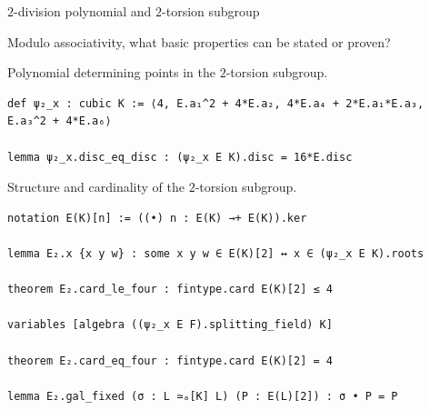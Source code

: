 \documentclass[10pt]{beamer}
\begin{document}
\begin{frame}[fragile, t]{$ 2 $-division polynomial and $ 2 $-torsion subgroup}

Modulo associativity, what basic properties can be stated or proven?

\vspace{0.5cm}

Polynomial determining points in the $ 2 $-torsion subgroup.

\begin{lstlisting}[basicstyle=\scriptsize, frame=single]
def ψ₂_x : cubic K := ⟨4, E.a₁^2 + 4*E.a₂, 4*E.a₄ + 2*E.a₁*E.a₃, E.a₃^2 + 4*E.a₆⟩

lemma ψ₂_x.disc_eq_disc : (ψ₂_x E K).disc = 16*E.disc
\end{lstlisting}

Structure and cardinality of the $ 2 $-torsion subgroup.

\begin{lstlisting}[basicstyle=\scriptsize, frame=single]
notation E(K)[n] := ((•) n : E(K) →+ E(K)).ker

lemma E₂.x {x y w} : some x y w ∈ E(K)[2] ↔ x ∈ (ψ₂_x E K).roots

theorem E₂.card_le_four : fintype.card E(K)[2] ≤ 4

variables [algebra ((ψ₂_x E F).splitting_field) K]

theorem E₂.card_eq_four : fintype.card E(K)[2] = 4

lemma E₂.gal_fixed (σ : L ≃ₐ[K] L) (P : E(L)[2]) : σ • P = P
\end{lstlisting}

\end{frame}
\end{document}
